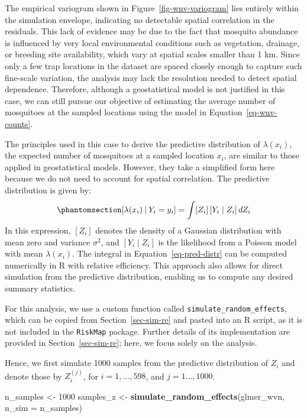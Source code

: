 \documentclass[
  letterpaper,
]{krantz}
\newenvironment{Shaded}{\begin{snugshade}}{\end{snugshade}}
\newcommand{\AttributeTok}[1]{\textcolor[rgb]{0.13,0.29,0.53}{#1}}
\newcommand{\DecValTok}[1]{\textcolor[rgb]{0.00,0.00,0.81}{#1}}
\newcommand{\FunctionTok}[1]{\textcolor[rgb]{0.13,0.29,0.53}{\textbf{#1}}}
\newcommand{\NormalTok}[1]{#1}
\newcommand{\OtherTok}[1]{\textcolor[rgb]{0.56,0.35,0.01}{#1}}
\begin{document}
The empirical variogram shown in Figure~\ref{fig-wnv-variogram} lies
entirely within the simulation envelope, indicating no detectable
spatial correlation in the residuals. This lack of evidence may be due
to the fact that mosquito abundance is influenced by very local
environmental conditions such as vegetation, drainage, or breeding site
availability, which vary at spatial scales smaller than 1 km. Since only
a few trap locations in the dataset are spaced closely enough to capture
such fine-scale variation, the analysis may lack the resolution needed
to detect spatial dependence. Therefore, although a geostatistical model
is not justified in this case, we can still pursue our objective of
estimating the average number of mosquitoes at the sampled locations
using the model in Equation~\ref{eq-wnv-counts}.

The principles used in this case to derive the predictive distribution
of \(\lambda(x_i)\), the expected number of mosquitoes at a sampled
location \(x_i\), are similar to those applied in geostatistical models.
However, they take a simplified form here because we do not need to
account for spatial correlation. The predictive distribution is given
by: \begin{equation}\phantomsection\label{eq-pred-distr}{
\left[\lambda(x_i) \:\middle | \: Y_i = y_i \right] = \int [Z_i] \, [Y_i \mid Z_i] \, dZ_i
}\end{equation} In this expression, \([Z_i]\) denotes the density of a
Gaussian distribution with mean zero and variance \(\sigma^2\), and
\([Y_i \mid Z_i]\) is the likelihood from a Poisson model with mean
\(\lambda(x_i)\). The integral in Equation~\ref{eq-pred-distr} can be
computed numerically in R with relative efficiency. This approach also
allows for direct simulation from the predictive distribution, enabling
us to compute any desired summary statistics.

For this analysis, we use a custom function called
\texttt{simulate\_random\_effects}, which can be copied from
Section~\ref{sec-sim-re} and pasted into an R script, as it is not
included in the \texttt{RiskMap} package. Further details of its
implementation are provided in Section~\ref{sec-sim-re}; here, we focus
solely on the analysis.

Hence, we first simulate 1000 samples from the predictive distribution
of \(Z_i\) and denote those by \(Z_i^{(j)}\), for \(i=1,\ldots,598\),
and \(j=1\ldots,1000\).

\begin{Shaded}
\begin{Highlighting}[]
\NormalTok{n\_samples }\OtherTok{\textless{}{-}} \DecValTok{1000}
\NormalTok{samples\_z }\OtherTok{\textless{}{-}} \FunctionTok{simulate\_random\_effects}\NormalTok{(glmer\_wvn, }\AttributeTok{n\_sim =}\NormalTok{ n\_samples)}
\end{Highlighting}
\end{Shaded}
\end{document}
